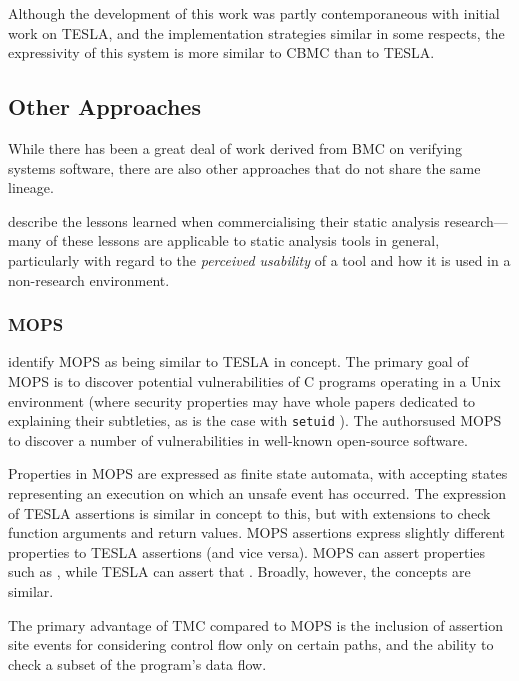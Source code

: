 Although the development of this work was partly contemporaneous with
initial work on TESLA, and the implementation strategies similar in some
respects, the expressivity of this system is more similar to CBMC than to TESLA.

\subsection{Other Approaches}

While there has been a great deal of work derived from BMC on verifying
systems software, there are also other approaches that do not share the
same lineage. 

\textcite{bessey_few_2010} describe the lessons learned when commercialising
their static analysis research---many of these lessons are applicable to static
analysis tools in general, particularly with regard to the \emph{perceived
usability} of a tool and how it is used in a non-research environment.

\subsubsection{MOPS}

\textcite{anderson_tesla:_2014} identify MOPS \cite{chen_mops:_2002} as being
similar to TESLA in concept. The primary goal of MOPS is to discover potential
vulnerabilities of C programs operating in a Unix environment (where security
properties may have whole papers dedicated to explaining their subtleties, as is
the case with \texttt{setuid} \cite{chen_setuid_2002}).  The authorsused
MOPS to discover a number of vulnerabilities in well-known open-source software.

Properties in MOPS are expressed as finite state automata, with accepting states
representing an execution on which an unsafe event has occurred. The expression
of TESLA assertions is similar in concept to this, but with extensions to check
function arguments and return values. MOPS assertions express slightly
different properties to TESLA assertions (and vice versa). MOPS can assert
properties such as , while TESLA can assert that
. Broadly, however, the concepts are similar.

The primary advantage of TMC compared to MOPS is the inclusion of assertion site
events for considering control flow only on certain paths, and the ability to
check a subset of the program's data flow.

